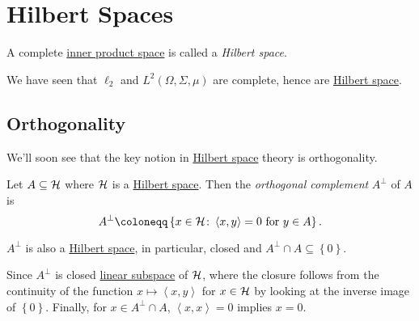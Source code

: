 \section{Hilbert Spaces}

\begin{definition}\label{def:Hilbert-space}
	A complete \hyperref[def:inner-product-space]{inner product space} is called a \emph{Hilbert space}.
\end{definition}

\begin{eg}
	We have seen that \(\ell _2\) and \(L^2(\Omega , \Sigma , \mu )\) are complete, hence are \hyperref[def:Hilbert-space]{Hilbert space}.
\end{eg}

\subsection{Orthogonality}
We'll soon see that the key notion in \hyperref[def:Hilbert-space]{Hilbert space} theory is orthogonality.
\begin{definition}\label{def:orthogonal-complement}
	Let \(A \subseteq \mathcal{\MakeUppercase{h}} \) where \(\mathcal{\MakeUppercase{h}}\) is a \hyperref[def:Hilbert-space]{Hilbert space}. Then the \emph{orthogonal complement} \(A^\perp\) of \(A\) is
	\[
		A^\perp \coloneqq \left\{ x\in \mathcal{\MakeUppercase{h}} \colon \left\langle x, y \right\rangle = 0 \text{ for } y\in A \right\}.
	\]
\end{definition}

\begin{remark}
	\(A^\perp\) is also a \hyperref[def:Hilbert-space]{Hilbert space}, in particular, closed and \(A^\perp \cap A \subseteq \left\{ 0 \right\} \).
\end{remark}
\begin{explanation}
	Since \(A^\perp\) is closed \hyperref[def:linear-vector-space]{linear subspace} of \(\mathcal{\MakeUppercase{h}} \), where the closure follows from the continuity of the function \(x\mapsto \left\langle x, y \right\rangle \) for \(x\in \mathcal{\MakeUppercase{h}} \) by looking at the inverse image of \(\left\{ 0 \right\}\). Finally, for \(x\in A^\perp \cap A\), \(\left\langle x, x \right\rangle = 0\) implies \(x = 0\).
\end{explanation}

